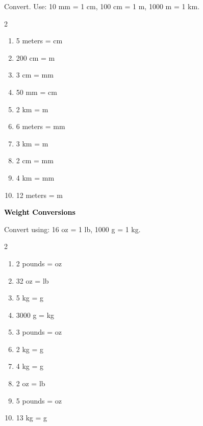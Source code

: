 \documentclass[12pt, letterpaper, fleqn]{article}
\newcommand{\blank}{\underline{\hspace{2.2cm}}}
\begin{document}
\noindent
Convert. Use: 10 mm = 1 cm, 100 cm = 1 m, 1000 m = 1 km.

\vspace{3mm}

\begin{multicols}{2}
\begin{enumerate}[itemsep=3cm, leftmargin=0.6cm]
\item 5 meters = \blank \; cm
\item 200 cm = \blank \; m
\item 3 cm = \blank \; mm
\item 50 mm = \blank \; cm
\item 2 km = \blank \; m
\item 6 meters = \blank \; mm
\item 3 km = \blank \; m
\item 2 cm = \blank \; mm
\item 4 km = \blank \; mm
\item 12 meters = \blank \; m
\end{enumerate}
\end{multicols}

\newpage

\begin{tcolorbox}[colback=customteal!20]
\large\textcolor{black}{\textbf{Weight Conversions}}
\end{tcolorbox}

\noindent
Convert using: 16 oz = 1 lb, 1000 g = 1 kg.

\vspace{3mm}

\begin{multicols}{2}
\begin{enumerate}[itemsep=3cm, leftmargin=0.6cm]
\item 2 pounds = \blank \; oz
\item 32 oz = \blank \; lb
\item 5 kg = \blank \; g
\item 3000 g = \blank \; kg
\item 3 pounds = \blank \; oz
\item 2 kg = \blank \; g
\item 4 kg = \blank \; g
\item 2 oz = \blank \; lb
\item 5 pounds = \blank \; oz
\item 13 kg = \blank \; g
\end{enumerate}
\end{multicols}
\end{document}
